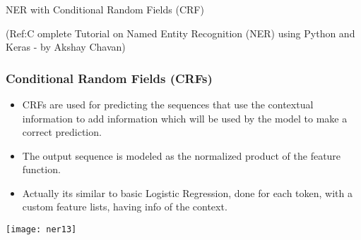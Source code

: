 \begin{frame}[fragile]\frametitle{}

\begin{center}
{\Large NER with Conditional Random Fields (CRF)}

{\tiny (Ref:C omplete Tutorial on Named Entity Recognition (NER) using Python and Keras - by Akshay Chavan)}
\end{center}


\end{frame}

\begin{frame}[fragile]\frametitle{Conditional Random Fields (CRFs)}
  \begin{itemize}
  \item CRFs are used for predicting the sequences that use the contextual information to add information which will be used by the model to make a correct prediction.
	\item The output sequence is modeled as the normalized product of the feature function.
	\item Actually its similar to basic Logistic Regression, done for each token, with a custom feature lists, having info of the context.
  \end{itemize}
	
	\begin{center}
\texttt{[image: ner13]}
\end{center}
\end{frame}



	



